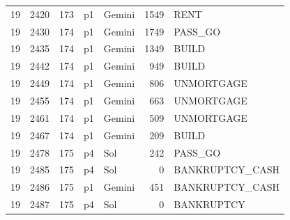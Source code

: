 \begin{longtable}{r r r l l r >{\ttfamily}l}
19 & 2420 & 173 & p1 & Gemini & 1549 & RENT \\
19 & 2430 & 174 & p1 & Gemini & 1749 & PASS\_GO \\
19 & 2435 & 174 & p1 & Gemini & 1349 & BUILD \\
19 & 2442 & 174 & p1 & Gemini & 949 & BUILD \\
19 & 2449 & 174 & p1 & Gemini & 806 & UNMORTGAGE \\
19 & 2455 & 174 & p1 & Gemini & 663 & UNMORTGAGE \\
19 & 2461 & 174 & p1 & Gemini & 509 & UNMORTGAGE \\
19 & 2467 & 174 & p1 & Gemini & 209 & BUILD \\
19 & 2478 & 175 & p4 & Sol & 242 & PASS\_GO \\
19 & 2485 & 175 & p4 & Sol & 0 & BANKRUPTCY\_CASH \\
19 & 2486 & 175 & p1 & Gemini & 451 & BANKRUPTCY\_CASH \\
19 & 2487 & 175 & p4 & Sol & 0 & BANKRUPTCY \\
\end{longtable}
\endgroup
{}
